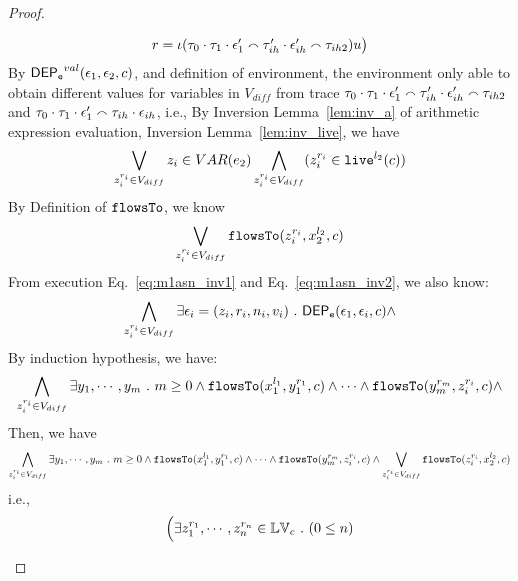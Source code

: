 \begin{proof}
\begin{case}[$\trace_2 = \trace_{ih} \cdot \event_{ih}$]
\begin{subcase}
\begin{subsubcase}
\begin{subsubsubcase}
\[\begin{array}{l}
    r = \iota(\mathtt{\tau}_0 \cdot \mathtt{\tau}_1 \cdot \mathtt{\epsilon}_1' \smallfrown \mathtt{\tau}_{ih}' \cdot \mathtt{\epsilon}_{ih}' \smallfrown \mathtt{\tau}_{ih2}) u \big)
  \end{array}
\]
%
By $\mathsf{DEP_{\mathtt{e}}}^{val}(\mathtt{\epsilon}_1, \mathtt{\epsilon}_2, c)$, and definition of environment, 
the environment only able to obtain different values for variables in $V_{diff}$
from trace $\mathtt{\tau}_0 \cdot \mathtt{\tau}_1 \cdot \mathtt{\epsilon}_1' \smallfrown \mathtt{\tau}_{ih}' \cdot \mathtt{\epsilon}_{ih}' \smallfrown \mathtt{\tau}_{ih2}$ 
and 
$\mathtt{\tau}_0 \cdot \mathtt{\tau}_1 \cdot \mathtt{\epsilon}_1' \smallfrown \mathtt{\tau}_{ih} \cdot \mathtt{\epsilon}_{ih}$, i.e.,
%
%
%
%
By {Inversion Lemma~\ref{lem:inv_a}} of arithmetic expression evaluation, Inversion Lemma~\ref{lem:inv_live}, we have 
%
\[
  \bigvee_{z_i^{r_i} \in V_{diff}} z_i \in VAR(e_2)
  \bigwedge_{z_i^{r_i} \in V_{diff}} (z_i^{r_i} \in \mathtt{live}^{l_2}(c))
\]
%
%
By Definition of $\mathtt{flowsTo}$, we know
\[
   \bigvee_{z_i^{r_i} \in V_{diff}}  \mathtt{flowsTo}(z_i^{r_i}, x_2^{l_2}, c)
\]
%
From execution Eq.~\ref{eq:m1asn_inv1} and Eq.~\ref{eq:m1asn_inv2}, we also know:
\[
  \bigwedge_{z_i^{r_i} \in V_{diff}}
  \exists \mathtt{\epsilon}_i = (z_i, r_i, n_i, v_i) ~.~ 
  \mathsf{DEP_{\mathtt{e}}}(\mathtt{\epsilon}_1, \mathtt{\epsilon}_i, c) \land 
\]
%
By induction hypothesis, we have:
\[
  \bigwedge_{z_i^{r_i} \in V_{diff}}
  \exists y_1, \cdots, y_m ~.~ 
  m \geq 0 \land
  \mathtt{flowsTo}(x_1^{l_1}, y_1^{r_1}, c) \land \cdots \land \mathtt{flowsTo}(y_m^{r_m}, z_i^{r_i}, c) \land 
\]
%
Then, we have
\[
  \bigwedge_{z_i^{r_i} \in V_{diff}}
  \exists y_1, \cdots, y_m ~.~ 
  m \geq 0 \land
  \mathtt{flowsTo}(x_1^{l_1}, y_1^{r_1}, c) \land \cdots \land \mathtt{flowsTo}(y_m^{r_m}, z_i^{r_i}, c) \land 
   \bigvee_{z_i^{r_i} \in V_{diff}}  \mathtt{flowsTo}(z_i^{r_i}, x_2^{l_2}, c)
\]
i.e.,
\[
\Big(\exists z_1^{r_1}, \cdots, z_n^{r_n} \in \mathbb{LV}_{{c}} ~.~ (0 \leq n  )
\]
\end{subsubsubcase}
\end{subsubcase}
\end{subcase}
\end{case}
\end{proof}
